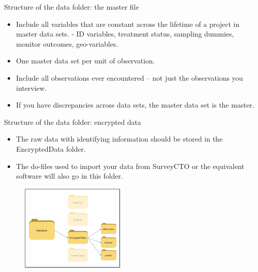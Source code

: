 \documentclass[aspectratio=169]{beamer}
\begin{document}
\begin{frame}{Structure of the data folder: the master file}

	\begin{itemize}[<default overlay specification>]
	\item<1> Include all variables that are constant across the lifetime of a project in master data sets. 
			\newline - ID variables, treatment status, sampling dummies, monitor outcomes, geo-variables.
	\item<1> One master data set per unit of observation. 
	\item<1> Include all observations ever encountered – not just the observations you interview. 
	\item<1> If you have discrepancies across data sets, the master data set is the master. 
\end{itemize}

\end{frame}

\begin{frame}[fragile]{Structure of the data folder: encrypted data}
\begin{multicols}{2}	
	
	\begin{itemize}[<default overlay specification>]
		\item<1> The raw data with identifying information should be stored in the EncryptedData folder.
		\item<1> The do-files used to import your data from SurveyCTO or the equivalent software will also go in this folder. 
	\end{itemize}
	
	\begin{figure}
		\centering
		\includegraphics[width=50mm]{img/Structure4}
	\end{figure}
	
\end{multicols}
\end{frame}
\end{document}
